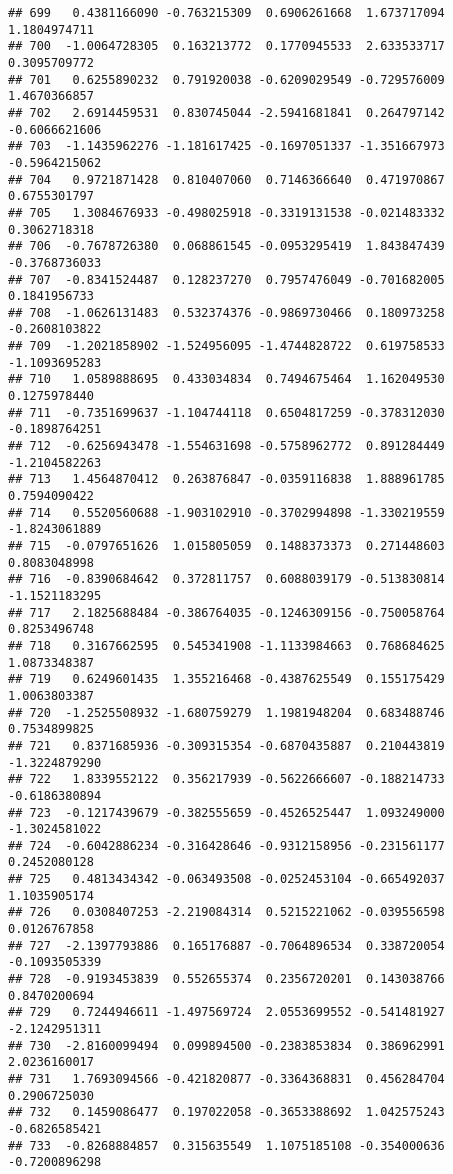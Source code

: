 \documentclass[
]{article}
\begin{document}
\begin{verbatim}
## 699   0.4381166090 -0.763215309  0.6906261668  1.673717094  1.1804974711
## 700  -1.0064728305  0.163213772  0.1770945533  2.633533717  0.3095709772
## 701   0.6255890232  0.791920038 -0.6209029549 -0.729576009  1.4670366857
## 702   2.6914459531  0.830745044 -2.5941681841  0.264797142 -0.6066621606
## 703  -1.1435962276 -1.181617425 -0.1697051337 -1.351667973 -0.5964215062
## 704   0.9721871428  0.810407060  0.7146366640  0.471970867  0.6755301797
## 705   1.3084676933 -0.498025918 -0.3319131538 -0.021483332  0.3062718318
## 706  -0.7678726380  0.068861545 -0.0953295419  1.843847439 -0.3768736033
## 707  -0.8341524487  0.128237270  0.7957476049 -0.701682005  0.1841956733
## 708  -1.0626131483  0.532374376 -0.9869730466  0.180973258 -0.2608103822
## 709  -1.2021858902 -1.524956095 -1.4744828722  0.619758533 -1.1093695283
## 710   1.0589888695  0.433034834  0.7494675464  1.162049530  0.1275978440
## 711  -0.7351699637 -1.104744118  0.6504817259 -0.378312030 -0.1898764251
## 712  -0.6256943478 -1.554631698 -0.5758962772  0.891284449 -1.2104582263
## 713   1.4564870412  0.263876847 -0.0359116838  1.888961785  0.7594090422
## 714   0.5520560688 -1.903102910 -0.3702994898 -1.330219559 -1.8243061889
## 715  -0.0797651626  1.015805059  0.1488373373  0.271448603  0.8083048998
## 716  -0.8390684642  0.372811757  0.6088039179 -0.513830814 -1.1521183295
## 717   2.1825688484 -0.386764035 -0.1246309156 -0.750058764  0.8253496748
## 718   0.3167662595  0.545341908 -1.1133984663  0.768684625  1.0873348387
## 719   0.6249601435  1.355216468 -0.4387625549  0.155175429  1.0063803387
## 720  -1.2525508932 -1.680759279  1.1981948204  0.683488746  0.7534899825
## 721   0.8371685936 -0.309315354 -0.6870435887  0.210443819 -1.3224879290
## 722   1.8339552122  0.356217939 -0.5622666607 -0.188214733 -0.6186380894
## 723  -0.1217439679 -0.382555659 -0.4526525447  1.093249000 -1.3024581022
## 724  -0.6042886234 -0.316428646 -0.9312158956 -0.231561177  0.2452080128
## 725   0.4813434342 -0.063493508 -0.0252453104 -0.665492037  1.1035905174
## 726   0.0308407253 -2.219084314  0.5215221062 -0.039556598  0.0126767858
## 727  -2.1397793886  0.165176887 -0.7064896534  0.338720054 -0.1093505339
## 728  -0.9193453839  0.552655374  0.2356720201  0.143038766  0.8470200694
## 729   0.7244946611 -1.497569724  2.0553699552 -0.541481927 -2.1242951311
## 730  -2.8160099494  0.099894500 -0.2383853834  0.386962991  2.0236160017
## 731   1.7693094566 -0.421820877 -0.3364368831  0.456284704  0.2906725030
## 732   0.1459086477  0.197022058 -0.3653388692  1.042575243 -0.6826585421
## 733  -0.8268884857  0.315635549  1.1075185108 -0.354000636 -0.7200896298

\end{verbatim}
\end{document}
